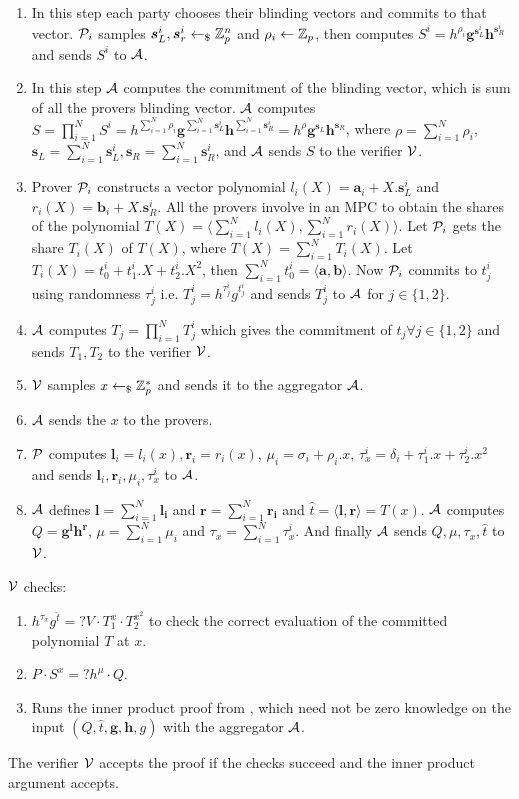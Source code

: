 \begin{enumerate}
	\item In this step each party chooses their blinding vectors and commits to that vector. ${\cal P}_i$ samples $\bm{s}^i_L, \bm{s}^i_r \leftarrow_\$ {\mathbb Z}_p^n$ and $\rho_i\leftarrow {\mathbb Z}_p$, then computes $S^i=h^{\rho_i}\bm{g}^{\bm{s}^i_L}\bm{h}^{\bm{s}^i_R}$ and sends $S^i$ to ${\cal A}$.
	\item In this step ${\cal A}$ computes the commitment of the blinding vector, which is sum of all the provers blinding vector. ${\cal A}$ computes $S = \prod_{i=1}^{N}S^i = h^{\sum_{i=1}^N\rho_i}\bm{g}^{\sum_{i=1}^N\bm{s}_L^i}\bm{h}^{\sum_{i=1}^N\bm{s}^i_R} = h^{\rho}\bm{g}^{\bm{s}_L}\bm{h}^{\bm{s}_R}$, where $\rho = \sum_{i=1}^{N}\rho_i$, $\bm{s}_L =\sum_{i=1}^{N} \bm{s}^i_L,  \bm{s}_R=\sum_{i=1}^{N}\bm{s}^i_R$, and ${\cal A}$ sends $S$ to the verifier ${\cal V}$.
	\item Prover ${\cal P}_i$ constructs a vector polynomial $l_i(X)=\bm{a}_i + X. \bm{s}^i_L$ and $r_i(X)=\bm{b}_i + X. \bm{s}^i_R$. All the provers involve in an MPC to obtain the shares of the polynomial $T(X)=\langle \sum_{i=1}^N l_i(X),\sum_{i=1}^N r_i(X)\rangle$. Let ${\cal P}_i$ gets the share $T_i(X)$ of $T(X)$, where $T(X)=\sum_{i=1}^{N}T_i(X)$. Let $T_i(X)= t^i_0+t^i_1.X+t^i_2.X^2$, then $\sum_{i=1}^N t^i_0=\langle \bm{a}, \bm{b} \rangle$. Now ${\cal P}_i$ commits to $t^i_j$ using randomness $\tau^i_j$ i.e. $T^i_j=h^{\tau^i_j}g^{t^i_j}$ and sends $T^i_j$ to ${\cal A}$ for $j\in \{1,2\}$.
	\item ${\cal A}$ computes $T_j=\prod_{i=1}^{N} T^i_j$ which gives the commitment of $t_j \forall j\in\{1,2\}$ and sends $T_1,T_2$ to the verifier ${\cal V}$.
	\item ${\cal V}$ samples $x\leftarrow_\${\mathbb Z}^*_p$ and sends it to the aggregator ${\cal A}$.
	\item ${\cal A}$ sends the $x$ to the provers. 
	\item ${\cal P}$ computes $\bm{l}_i=l_i(x), \bm{r}_i=r_i(x)$, $\mu_i= \sigma_i+\rho_i.x$, $\tau^i_x= \delta_i+\tau^i_1.x+\tau^i_2.x^2$ and sends $\bm{l}_i,\bm{r}_i, \mu_i, \tau^i_x$ to ${\cal A}$.
	\item ${\cal A}$ defines $\bm{l}=\sum_{i=1}^N\bm{l_i}$ and $\bm{r}=\sum_{i=1}^N\bm{r_i}$ and $\hat{t}=\langle \bm{l},\bm{r}\rangle =T(x)$. ${\cal A}$ computes $Q=\bm{g^lh^r}$, $\mu=\sum_{i=1}^N \mu_i$ and $\tau_x= \sum_{i=1}^{N}\tau_x^i$. And finally ${\cal A}$ sends $Q, \mu, \tau_x, \hat{t}$ to ${\cal V}$.
\end{enumerate}
${\cal V}$ checks: 
\begin{enumerate}
	\item $h^{\tau_x}g^{\hat{t}}=?V\cdot T_1^x\cdot T_2^{x^2}$ to check the correct evaluation of the committed polynomial $T$ at $x$.
	\item $P\cdot S^x =? h^{\mu}\cdot Q$. 
	\item Runs the inner product proof from \cite{Bulletproofs}, which need not be zero knowledge on the input $(Q, \hat{t}, \bm{g}, \bm{h}, g)$ with the aggregator ${\cal A}$.
\end{enumerate}
The verifier ${\cal V}$ accepts the proof if the checks succeed and the inner product argument accepts.

